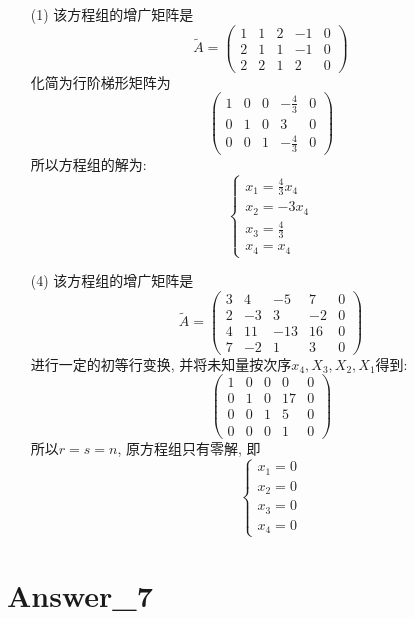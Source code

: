 \documentclass{article}
\begin{document}
\begin{itemize}
    \item[(1)]
    该方程组的增广矩阵是
    $$\tilde{A} = \begin{pmatrix}
        1 & 1 & 2 & -1 & 0 \\
        2 & 1 & 1 & -1 & 0 \\
        2 & 2 & 1 & 2 & 0
    \end{pmatrix}       
    $$
    化简为行阶梯形矩阵为
    $$
    \begin{pmatrix}
        1 & 0 & 0 & -\frac{4}{3} & 0 \\
        0 & 1 & 0 & 3 & 0 \\
        0 & 0 & 1 & -\frac{4}{3} & 0
    \end{pmatrix}
    $$
    所以方程组的解为:
    $$
    \begin{cases} 
        x_1 = \frac{4}{3}x_4 \\
        x_2 = -3x_4 \\
        x_3 = \frac{4}{3} \\
        x_4 = x_4
    \end{cases}
    $$
    \item[(4)]
    该方程组的增广矩阵是
    $$\tilde{A} = \begin{pmatrix}
        3 & 4 & -5 & 7 & 0 \\
        2 & -3 & 3 & -2 & 0 \\
        4 & 11 & -13 & 16 & 0 \\
        7 & -2 & 1 & 3 & 0
    \end{pmatrix}
    $$
    进行一定的初等行变换, 并将未知量按次序$x_4, X_3, X_2, X_1$得到:
    $$
    \begin{pmatrix}
        1 & 0 & 0 & 0 & 0 \\
        0 & 1 & 0 & 17 & 0 \\
        0 & 0 & 1 & 5 & 0 \\
        0 & 0 & 0 & 1 & 0
    \end{pmatrix}
    $$
    所以$r = s = n$, 原方程组只有零解, 即
    $$
    \begin{cases}
        x_1 = 0 \\
        x_2 = 0 \\
        x_3 = 0 \\
        x_4 = 0 
    \end{cases}
    $$
\end{itemize}

\section{Answer\_7}
\end{document}
